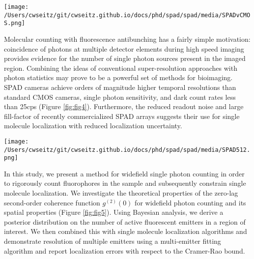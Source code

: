 \begin{figure*}[t]
\centering
\texttt{[image: /Users/cwseitz/git/cwseitz.github.io/docs/phd/spad/spad/media/SPADvCMOS.png]}
\caption{\textbf{Comparison of quantum dot images between CMOS and SPAD cameras}. (left) SPAD image of Qdot655 coated on a glass coverslip using a 100X/1.4NA oil-immersion objective (Nikon) and a 10ms exposure time. (right) CMOS image of Qdot655 using a 60X/1.4NA oil-immersion objective (Olympus) and a 10ms exposure time. Both use continuous-wave 640nm excitation}
\label{fig:fig4}
\end{figure*}    

Molecular counting with fluorescence antibunching has a fairly simple motivation: coincidence of photons at multiple detector elements during high speed imaging provides evidence for the number of single photon sources present in the imaged region. Combining the ideas of conventional super-resolution approaches with photon statistics may prove to be a powerful set of methods for bioimaging. SPAD cameras achieve orders of magnitude higher temporal resolutions than standard CMOS cameras, single photon sensitivity, and dark count rates less than 25cps (Figure \ref{fig:fig4}). Furthermore, the reduced readout noise and large fill-factor of recently commercialized SPAD arrays suggests their use for single molecule localization with reduced localization uncertainty.

\begin{figure*}[t]
\centering
\texttt{[image: /Users/cwseitz/git/cwseitz.github.io/docs/phd/spad/spad/media/SPAD512.png]}
\caption{\textbf{Experimental setup for widefield photon counting}. A 532nm pulsed laser is directed through a spatial filter, galvo mirror, and passed through filtering and focusing optics to a 100X oil-immersion objective. Emission light of a 50um grid is projected onto the SPAD512 camera (inset)}
\label{fig:fig5}
\end{figure*}    


In this study, we present a method for widefield single photon counting in order to rigorously count fluorophores in the sample and subsequently constrain single molecule localization. We investigate the theoretical properties of the zero-lag second-order coherence function $g^{(2)}(0)$ for widefield photon counting and its spatial properties (Figure \ref{fig:fig5}). Using Bayesian analysis, we derive a posterior distribution on the number of active fluorescent emitters in a region of interest. We then combined this with single molecule localization algorithms and demonstrate resolution of multiple emitters using a multi-emitter fitting algorithm and report localization errors with respect to the Cramer-Rao bound.

